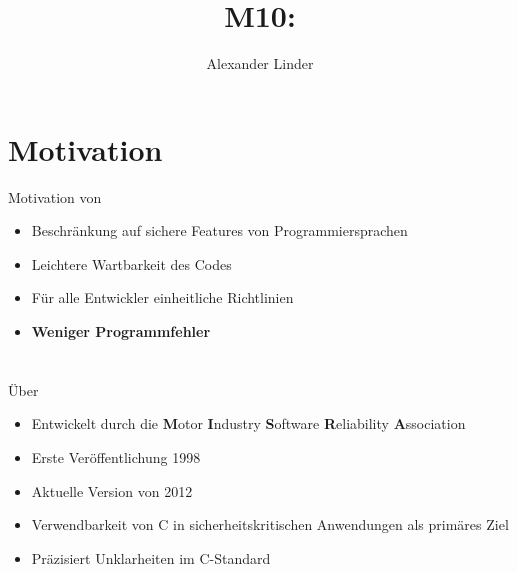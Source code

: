 \documentclass{beamer}
\title{M10: \sqss}
\author[Linder]{Alexander Linder}
\date{} %
\institute{FAKULTÄT FÜR INFORMATIK}
\begin{document}

    \begin{frame}
        \maketitle
    \end{frame}

    \begin{frame}
        \tableofcontents
    \end{frame}

    \section{Motivation}
    \label{sec:motivation}
    \begin{frame}{Motivation von \sqss}
        \begin{itemize}
            \item Beschränkung auf sichere Features von Programmiersprachen
            \item Leichtere Wartbarkeit des Codes
            \item Für alle Entwickler einheitliche Richtlinien
            \item \textbf{Weniger Programmfehler}
        \end{itemize}
    \end{frame}

    \section{\misra}
    \label{sec:misra-c}
    \begin{frame}{Über \misra}
        \begin{itemize}
            \item Entwickelt durch die \textbf{M}otor \textbf{I}ndustry \textbf{S}oftware \textbf{R}eliability \textbf{A}ssociation
            \item Erste Veröffentlichung 1998
            \item Aktuelle Version von 2012
            \item Verwendbarkeit von C in sicherheitskritischen Anwendungen als primäres Ziel
            \item Präzisiert Unklarheiten im C-Standard
        \end{itemize}
    \end{frame}
\end{document}
